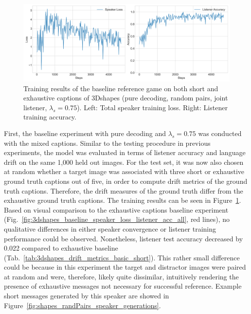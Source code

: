 \begin{figure}[h]
	\centering
	\includegraphics[width=\linewidth]{images/3dshapes_wShort_baseline_random_075_losses.png}
	\caption{Training results of the baseline reference game on both short and exhaustive captions of 3Dshapes (pure decoding, random pairs, joint listener, $\lambda_s=0.75$). Left: Total speaker training loss. Right: Listener training accuracy.}
	\label{fig:3dshapes_wShort_075_speaker_losses_listener_acc}
\end{figure}

First, the baseline experiment with pure decoding and $\lambda_s = 0.75$ was conducted with the mixed captions. Similar to the testing procedure in previous experiments, the model was evaluated in terms of listener accuracy and language drift on the same 1,000 held out images. For the test set, it was now also chosen at random whether a target image was associated with three short or exhaustive ground truth captions out of five, in order to compute drift metrics of the ground truth captions. Therefore, the drift measures of the ground truth differ from the exhaustive ground truth captions.
The training results can be seen in Figure~\ref{fig:3dshapes_wShort_075_speaker_losses_listener_acc}. Based on visual comparison to the exhaustive captions baseline experiment (Fig.~\ref{fig:3dshapes_baseline_speaker_loss_listener_acc_all}, red lines), no qualitative differences in either speaker convergence or listener training performance could be observed. Nonetheless, listener test accuracy decreased by 0.022 compared to exhaustive baseline (Tab.~\ref{tab:3dshapes_drift_metrics_basic_short}).
This rather small difference could be because in this experiment the target and distractor images were paired at random and were, therefore, likely quite dissimilar, intuitively rendering the presence of exhaustive messages not necessary for successful reference. Example short messages generated by this speaker are showed in Figure~\ref{fig:shapes_randPairs_speaker_generations}.

